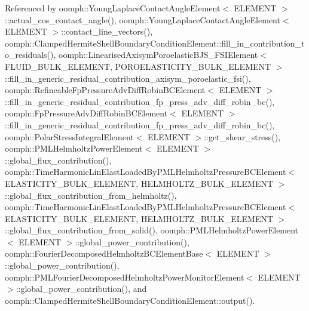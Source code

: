 Referenced by oomph\+::\+Young\+Laplace\+Contact\+Angle\+Element$<$ E\+L\+E\+M\+E\+N\+T $>$\+::actual\+\_\+cos\+\_\+contact\+\_\+angle(), oomph\+::\+Young\+Laplace\+Contact\+Angle\+Element$<$ E\+L\+E\+M\+E\+N\+T $>$\+::contact\+\_\+line\+\_\+vectors(), oomph\+::\+Clamped\+Hermite\+Shell\+Boundary\+Condition\+Element\+::fill\+\_\+in\+\_\+contribution\+\_\+to\+\_\+residuals(), oomph\+::\+Linearised\+Axisym\+Poroelastic\+B\+J\+S\+\_\+\+F\+S\+I\+Element$<$ F\+L\+U\+I\+D\+\_\+\+B\+U\+L\+K\+\_\+\+E\+L\+E\+M\+E\+N\+T, P\+O\+R\+O\+E\+L\+A\+S\+T\+I\+C\+I\+T\+Y\+\_\+\+B\+U\+L\+K\+\_\+\+E\+L\+E\+M\+E\+N\+T $>$\+::fill\+\_\+in\+\_\+generic\+\_\+residual\+\_\+contribution\+\_\+axisym\+\_\+poroelastic\+\_\+fsi(), oomph\+::\+Refineable\+Fp\+Pressure\+Adv\+Diff\+Robin\+B\+C\+Element$<$ E\+L\+E\+M\+E\+N\+T $>$\+::fill\+\_\+in\+\_\+generic\+\_\+residual\+\_\+contribution\+\_\+fp\+\_\+press\+\_\+adv\+\_\+diff\+\_\+robin\+\_\+bc(), oomph\+::\+Fp\+Pressure\+Adv\+Diff\+Robin\+B\+C\+Element$<$ E\+L\+E\+M\+E\+N\+T $>$\+::fill\+\_\+in\+\_\+generic\+\_\+residual\+\_\+contribution\+\_\+fp\+\_\+press\+\_\+adv\+\_\+diff\+\_\+robin\+\_\+bc(), oomph\+::\+Polar\+Stress\+Integral\+Element$<$ E\+L\+E\+M\+E\+N\+T $>$\+::get\+\_\+shear\+\_\+stress(), oomph\+::\+P\+M\+L\+Helmholtz\+Power\+Element$<$ E\+L\+E\+M\+E\+N\+T $>$\+::global\+\_\+flux\+\_\+contribution(), oomph\+::\+Time\+Harmonic\+Lin\+Elast\+Loaded\+By\+P\+M\+L\+Helmholtz\+Pressure\+B\+C\+Element$<$ E\+L\+A\+S\+T\+I\+C\+I\+T\+Y\+\_\+\+B\+U\+L\+K\+\_\+\+E\+L\+E\+M\+E\+N\+T, H\+E\+L\+M\+H\+O\+L\+T\+Z\+\_\+\+B\+U\+L\+K\+\_\+\+E\+L\+E\+M\+E\+N\+T $>$\+::global\+\_\+flux\+\_\+contribution\+\_\+from\+\_\+helmholtz(), oomph\+::\+Time\+Harmonic\+Lin\+Elast\+Loaded\+By\+P\+M\+L\+Helmholtz\+Pressure\+B\+C\+Element$<$ E\+L\+A\+S\+T\+I\+C\+I\+T\+Y\+\_\+\+B\+U\+L\+K\+\_\+\+E\+L\+E\+M\+E\+N\+T, H\+E\+L\+M\+H\+O\+L\+T\+Z\+\_\+\+B\+U\+L\+K\+\_\+\+E\+L\+E\+M\+E\+N\+T $>$\+::global\+\_\+flux\+\_\+contribution\+\_\+from\+\_\+solid(), oomph\+::\+P\+M\+L\+Helmholtz\+Power\+Element$<$ E\+L\+E\+M\+E\+N\+T $>$\+::global\+\_\+power\+\_\+contribution(), oomph\+::\+Fourier\+Decomposed\+Helmholtz\+B\+C\+Element\+Base$<$ E\+L\+E\+M\+E\+N\+T $>$\+::global\+\_\+power\+\_\+contribution(), oomph\+::\+P\+M\+L\+Fourier\+Decomposed\+Helmholtz\+Power\+Monitor\+Element$<$ E\+L\+E\+M\+E\+N\+T $>$\+::global\+\_\+power\+\_\+contribution(), and oomph\+::\+Clamped\+Hermite\+Shell\+Boundary\+Condition\+Element\+::output().

\mbox{\label{classoomph_1_1FaceElement_a58b9a1328c1c991142d58d1202c561e1}} 

